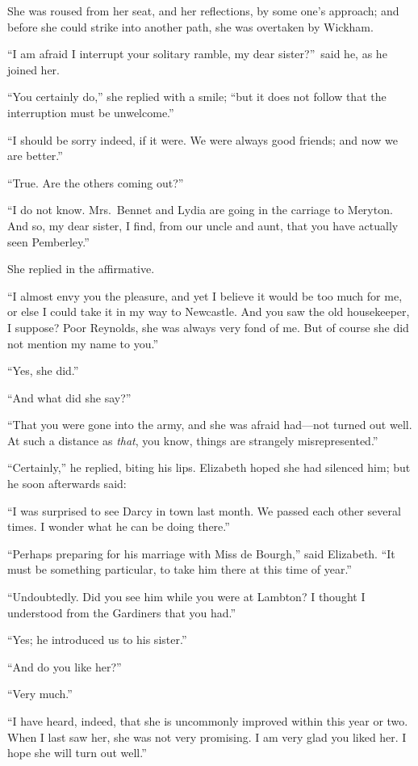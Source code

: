 \documentclass[12pt,english,oneside]{book}
\begin{document}
She was roused from her seat, and her reflections, by some one's approach;
and before she could strike into another path, she was overtaken by
Wickham.

{}``I am afraid I interrupt your solitary ramble, my dear sister?''\ 
said he, as he joined her.

{}``You certainly do,'' she replied with a smile; {}``but it does
not follow that the interruption must be unwelcome.''

{}``I should be sorry indeed, if it were. We were always good friends;
and now we are better.''

{}``True. Are the others coming out?''\ 

{}``I do not know. Mrs.\ Bennet and Lydia are going in the carriage
to Meryton. And so, my dear sister, I find, from our uncle and aunt,
that you have actually seen Pemberley.''

She replied in the affirmative.

{}``I almost envy you the pleasure, and yet I believe it would be
too much for me, or else I could take it in my way to Newcastle. And
you saw the old housekeeper, I suppose? Poor Reynolds, she was always
very fond of me. But of course she did not mention my name to you.''

{}``Yes, she did.''

{}``And what did she say?''\ 

{}``That you were gone into the army, and she was afraid had\mbox{---}not
turned out well. At such a distance as \textit{that}, you know, things
are strangely misrepresented.''

{}``Certainly,'' he replied, biting his lips. Elizabeth hoped she
had silenced him; but he soon afterwards said:

{}``I was surprised to see Darcy in town last month. We passed each
other several times. I wonder what he can be doing there.''

{}``Perhaps preparing for his marriage with Miss de Bourgh,'' said
Elizabeth. {}``It must be something particular, to take him there
at this time of year.''

{}``Undoubtedly. Did you see him while you were at Lambton? I thought
I understood from the Gardiners that you had.''

{}``Yes; he introduced us to his sister.''

{}``And do you like her?''\ 

{}``Very much.''

{}``I have heard, indeed, that she is uncommonly improved within
this year or two. When I last saw her, she was not very promising.
I am very glad you liked her. I hope she will turn out well.''
\end{document}
